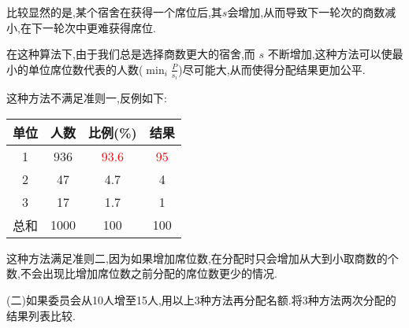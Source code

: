 \documentclass{article}
\newcommand{\red}[1]{\textcolor{red}{#1}}
\begin{document}
\begin{enumerate}
比较显然的是,某个宿舍在获得一个席位后,其$s$会增加,从而导致下一轮次的商数减小,在下一轮次中更难获得席位. 

在这种算法下,由于我们总是选择商数更大的宿舍,而 $s$ 不断增加,这种方法可以使最小的单位席位数代表的人数($\min_i{\frac{P}{s_i}}$)尽可能大,从而使得分配结果更加公平.

这种方法不满足准则一,反例如下:

\begin{center}
    \begin{tabular}{|c|c|c|c|}
    \hline
    单位 & 人数 & 比例(\%) & 结果 \\
    \hline
    1 & 936 & \red{93.6} & \red{95} \\
    \hline
    2 & 47 & 4.7 & 4 \\
    \hline
    3 & 17 & 1.7 & 1 \\
    \hline
    总和 & 1000 & 100 & 100 \\
    \hline
    \end{tabular}
\end{center}

这种方法满足准则二,因为如果增加席位数,在分配时只会增加从大到小取商数的个数,不会出现比增加席位数之前分配的席位数更少的情况.

\end{enumerate}

\noindent (二)如果委员会从10人增至15人,用以上3种方法再分配名额.将3种方法两次分配的结果列表比较.
\end{document}
